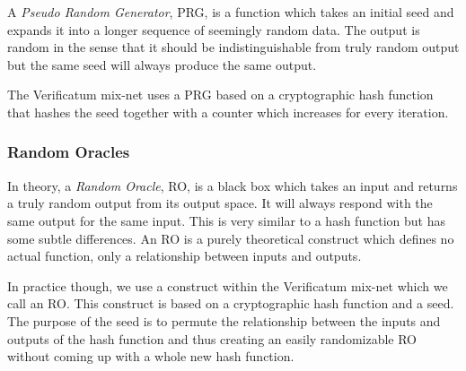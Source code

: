 A \emph{Pseudo Random Generator}, PRG, is a function which takes an
initial seed and expands it into a longer sequence of seemingly random
data. The output is random in the sense that it should be
indistinguishable from truly random output but the same seed will
always produce the same output.

The Verificatum mix-net uses a PRG based on a cryptographic hash
function that hashes the seed together with a counter which increases
for every iteration.

\subsubsection{Random Oracles}

In theory, a \emph{Random Oracle}, RO, is a black box which takes an
input and returns a truly random output from its output space. It will
always respond with the same output for the same input. This is very
similar to a hash function but has some subtle differences. An RO is a
purely theoretical construct which defines no actual function, only a
relationship between inputs and outputs.

In practice though, we use a construct within the Verificatum mix-net
which we call an RO. This construct is based on a cryptographic hash
function and a seed. The purpose of the seed is to permute the
relationship between the inputs and outputs of the hash function and
thus creating an easily randomizable RO without coming up with a whole
new hash function.
